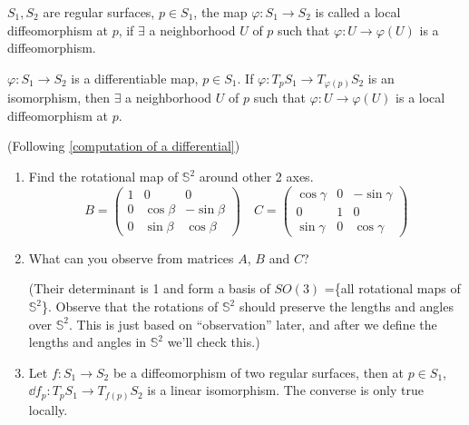\begin{definition}
    \(S_1,S_2\) are regular surfaces, \(p\in S_1\), the map 
    \(\varphi\colon S_1\to S_2\) is called a local 
    diffeomorphism at \(p\), if \(\exists\) a neighborhood
    \(U\) of \(p\) such that \(\varphi\colon U\to \varphi(U)\)
    is a diffeomorphism.
\end{definition}
\begin{proposition}
    \(\varphi\colon S_1\to S_2\) is a differentiable map, 
    \(p\in S_1\). If \(\varphi\colon T_p S_1\to T_{\varphi(p)}S_2\)
    is an isomorphism, then \(\exists\) a neighborhood \(U\) of 
    \(p\) such that \(\varphi\colon U\to \varphi(U)\) is a local 
    diffeomorphism at \(p\).
\end{proposition}
\begin{exercise} (Following \cref{computation of a differential})
\begin{enumerate}[(1)]
    \item Find the rotational map of \(\mathbb{S}^2\) around 
    other 2 axes.
    \[
        B=\begin{pmatrix}
            1&0&0\\
            0&\cos\beta&-\sin\beta\\
            0&\sin\beta&\cos\beta
        \end{pmatrix}\quad
        C=\begin{pmatrix}
            \cos\gamma&0&-\sin\gamma\\
            0&1&0\\
            \sin\gamma&0&\cos\gamma
        \end{pmatrix}    
    \]
    \item What can you observe from matrices \(A\), \(B\) and 
    \(C\)? 

    (Their determinant is 1 and form a basis of \(SO(3)\)
    =\{all rotational maps of \(\mathbb{S}^2\)\}. Observe that
    the rotations of \(\mathbb{S}^2\) should preserve the 
    lengths and angles over \(\mathbb{S}^2\). This is just 
    based on ``observation'' later, and after we define 
    the lengths and angles in \(\mathbb{S}^2\) we'll 
    check this.)
    \item Let \(f\colon S_1\to S_2\) be a diffeomorphism of two regular surfaces,
        then at \(p\in S_1\), \(\dd{f_p}\colon T_pS_1\to T_{f(p)}S_2\) is
        a linear isomorphism. The converse is only true locally.
\end{enumerate} 
\end{exercise}

